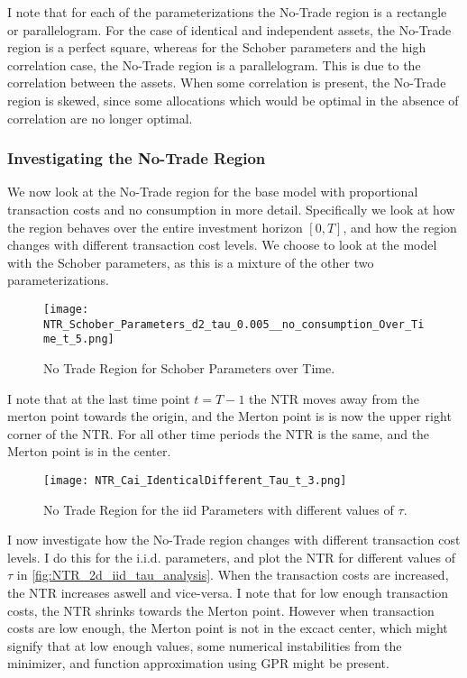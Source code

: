\documentclass[11pt]{article}
\begin{document}
I note that for each of the parameterizations the No-Trade region is a rectangle or parallelogram.
For the case of identical and independent assets, the No-Trade region is a perfect square, whereas for the Schober parameters and the high correlation case,
the No-Trade region is a parallelogram. This is due to the correlation between the assets. When some correlation is present, the No-Trade region is skewed,
since some allocations which would be optimal in the absence of correlation are no longer optimal. 
\subsubsection{Investigating the No-Trade Region} \label{Subsubsection: InvestigatingNTR}
We now look at the No-Trade region for the base model with proportional transaction costs and no consumption in more detail.
Specifically we look at how the region behaves over the entire investment horizon $[0, T]$, and how the region changes with different transaction cost levels.
We choose to look at the model with the Schober parameters, as this is a mixture of the other two parameterizations.

\begin{figure}[!ht]
    \centering
    \texttt{[image: NTR\_Schober\_Parameters\_d2\_tau\_0.005\_\_no\_consumption\_Over\_Time\_t\_5.png]}
    \caption{No Trade Region for Schober Parameters over Time.}
    \label{fig:NTR_2d_iid_standalone}
\end{figure}

I note that at the last time point $t = T-1$ the \ac{NTR} moves away from the merton point towards the origin, and the Merton point is is
now the upper right corner of the \ac{NTR}. For all other time periods the \ac{NTR} is the same, and the Merton point is in the center.

\begin{figure}[!ht]
    \centering
    \texttt{[image: NTR\_Cai\_IdenticalDifferent\_Tau\_t\_3.png]}
    \caption{No Trade Region for the iid Parameters with different values of $\tau$.}
    \label{fig:NTR_2d_iid_tau_analysis}
\end{figure}
I now investigate how the No-Trade region changes with different transaction cost levels.
I do this for the i.i.d. parameters, and plot the \ac{NTR} for different values of $\tau$ in \autoref{fig:NTR_2d_iid_tau_analysis}.
When the transaction costs are increased, the \ac{NTR} increases aswell and vice-versa. 
I note that for low enough transaction costs, the \ac{NTR} shrinks towards the Merton point.
However when transaction costs are low enough, the Merton point is not in the excact center, which might signify that at low enough values, some numerical instabilities from the
minimizer, and function approximation using \ac{GPR} might be present.
\end{document}

